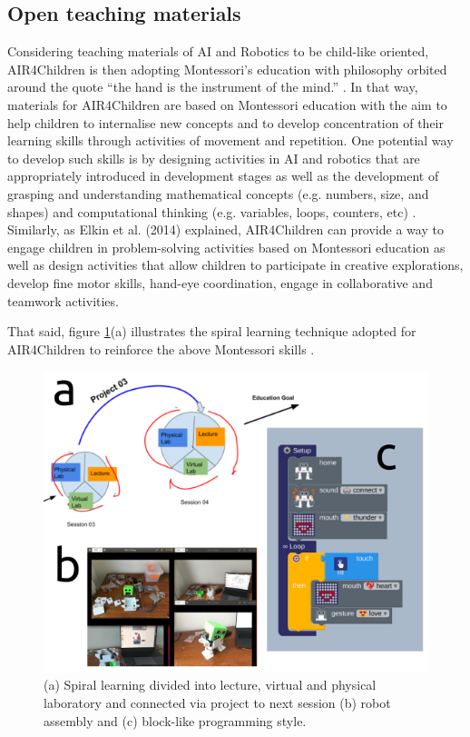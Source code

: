 \documentclass[sigconf]{acmart}
\begin{document}
\subsection{Open teaching materials}
Considering teaching materials of AI and Robotics to be child-like oriented, AIR4Children is then adopting Montessori's education with philosophy orbited around the quote “the hand is the instrument of the mind.” \cite{montessori2013absorbent}.
In that way, materials for AIR4Children are based on Montessori education with the aim to help children to internalise new concepts and to develop concentration of their learning skills through activities of movement and repetition.
One potential way to develop such skills is by designing activities in AI and robotics that are appropriately introduced in development stages \cite{bers2008, bers-horn2010, kazakoff-bers2012} as well as the development of grasping and understanding mathematical concepts (e.g. numbers, size, and shapes) and computational thinking (e.g. variables, loops, counters, etc) \cite{bers2012, resnick1998}.
Similarly, as Elkin et al. (2014) \cite{elkin2014} explained, AIR4Children can provide a way to engage children in problem-solving activities based on Montessori education as well as design activities that allow children to participate in creative explorations, develop fine motor skills, hand-eye coordination, engage in collaborative and teamwork activities.

That said, figure \ref{fig:tm}(a) illustrates the spiral learning technique adopted for AIR4Children to reinforce the above Montessori skills \cite{tarik2017}.
\begin{figure}[h]
  \centering
  \includegraphics[width=\linewidth]{../figures/teaching-materials/versions/drawing-v00.png}
  \caption{(a) Spiral learning divided into lecture, virtual and physical laboratory and connected via project to next session \cite{tarik2017} (b) robot assembly and (c) block-like programming style.}
  \label{fig:tm}
\end{figure}
 
\end{document}
